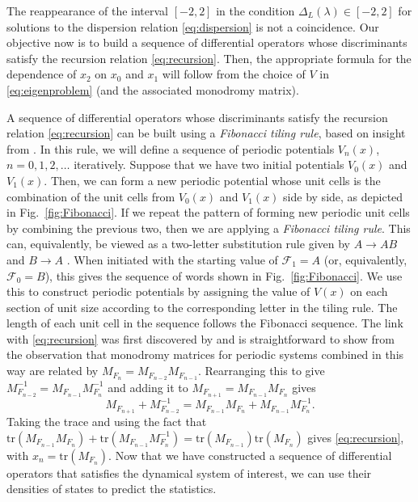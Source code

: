 \documentclass[nofootinbib,prb,amsmath,amssymb,twocolumn,floatfix]{revtex4-2}
\theoremstyle{definition}
\newcommand{\F}{\mathcal{F}}
\newcommand{\tr}{\mathrm{tr}}
\begin{document}
The reappearance of the interval $[-2,2]$ in the condition $\Delta_L(\lambda)\in[-2,2]$ for solutions to the dispersion relation \eqref{eq:dispersion} is not a coincidence. Our objective now is to build a sequence of differential operators whose discriminants satisfy the recursion relation \eqref{eq:recursion}. Then, the appropriate formula for the dependence of $x_2$ on $x_0$ and $x_1$ will follow from the choice of $V$ in \eqref{eq:eigenproblem} (and the associated monodromy matrix).

A sequence of differential operators whose discriminants satisfy the recursion relation \eqref{eq:recursion} can be built using a \emph{Fibonacci tiling rule}, based on insight from \cite{kohmoto1983localization}. In this rule, we will define a sequence of periodic potentials $V_n(x)$, $n=0,1,2,\dots$ iteratively. Suppose that we have two initial potentials $V_0(x)$ and $V_1(x)$. Then, we can form a new periodic potential whose unit cells is the combination of the unit cells from  $V_0(x)$ and $V_1(x)$ side by side, as depicted in Fig.~\ref{fig:Fibonacci}. If we repeat the pattern of forming new periodic unit cells by combining the previous two, then we are applying a \emph{Fibonacci tiling rule}. This can, equivalently, be viewed as a two-letter substitution rule given by $A\to AB$ and $B\to A$ \cite{kolavr1993new, levine1984quasicrystals}. When initiated with the starting value of $\F_1=A$ (or, equivalently, $\F_0=B$), this gives the sequence of words shown in Fig.~\ref{fig:Fibonacci}. We use this to construct periodic potentials by assigning the value of $V(x)$ on each section of unit size according to the corresponding letter in the tiling rule. The length of each unit cell in the sequence follows the Fibonacci sequence. The link with \eqref{eq:recursion} was first discovered by \cite{kohmoto1983localization} and is straightforward to show from the observation that monodromy matrices for periodic systems combined in this way are related by $M_{F_n}=M_{F_{n-2}}M_{F_{n-1}}$. Rearranging this to give $M_{F_{n-2}}^{-1}=M_{F_{n-1}}M_{F_n}^{-1}$ and adding it to $M_{F_{n+1}}=M_{F_{n-1}}M_{F_{n}}$ gives 
\begin{equation}
	M_{F_{n+1}}+M_{F_{n-2}}^{-1}=M_{F_{n-1}}M_{F_{n}}+M_{F_{n-1}}M_{F_n}^{-1}.
\end{equation}
Taking the trace and using the fact that $\tr(M_{F_{n-1}}M_{F_{n}})+\tr(M_{F_{n-1}}M_{F_n}^{-1}) =\tr(M_{F_{n-1}})\tr(M_{F_{n}})$ gives \eqref{eq:recursion}, with $x_n=\tr(M_{F_n})$. Now that we have constructed a sequence of differential operators that satisfies the dynamical system of interest, we can use their densities of states to predict the statistics. 
\end{document}
